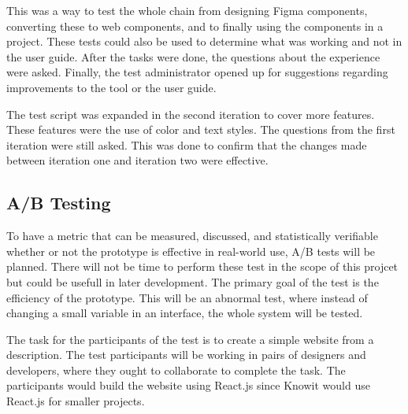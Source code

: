 This was a way to test the whole chain from designing Figma \glspl{component}, converting these to web \glspl{component}, and to finally using the \glspl{component} in a project. These tests could also be used to determine what was working and not in the user guide. After the tasks were done, the questions about the experience were asked. Finally, the test administrator opened up for suggestions regarding improvements to the tool or the user guide. 

The test script was expanded in the second iteration to cover more features. These features were the use of color and text styles. The questions from the first iteration were still asked. This was done to confirm that the changes made between iteration one and iteration two were effective. 


\subsection{ A/B Testing }%
\label{sub:ab-testing}
To have a metric that can be measured, discussed, and statistically verifiable whether or not the prototype is effective in real-world use, A/B tests will be planned. There will not be time to perform these test in the scope of this projcet but could be usefull in later development. The primary goal of the test is the efficiency of the prototype. This will be an abnormal test, where instead of changing a small variable in an interface, the whole system will be tested. 




The task for the participants of the test is to create a simple website from a description. The test participants will be working in pairs of designers and developers, where they ought to collaborate to complete the task. The participants would build the website using React.js since Knowit would use React.js for smaller projects.  

